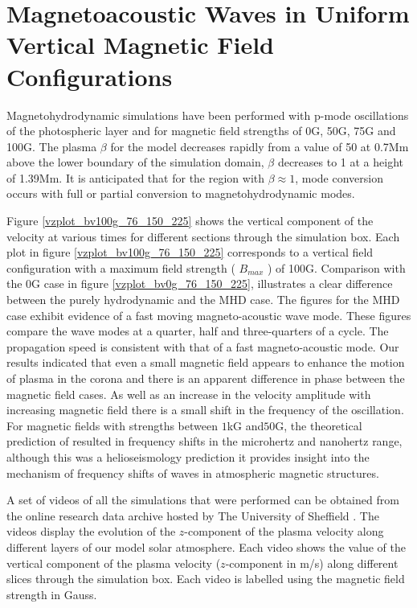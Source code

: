 \documentclass[linenumbers]{aastex63}
\begin{document}

\section{Magnetoacoustic Waves in Uniform Vertical Magnetic Field Configurations}
Magnetohydrodynamic simulations have been performed with p-mode oscillations of the photospheric layer and for magnetic field strengths of 0G, 50G, 75G and 100G. The plasma $\beta$ for the model decreases rapidly from a value of 50 at 0.7Mm above the lower boundary of the simulation domain, $\beta$ decreases to 1 at a height of 1.39Mm.  It is anticipated that for the region with $\beta \approx 1$, mode conversion occurs with full or partial conversion to magnetohydrodynamic modes. 

 Figure \ref{vzplot_bv100g_76_150_225} shows the vertical component of the velocity at various times for different sections through the simulation box. Each plot in  figure \ref{vzplot_bv100g_76_150_225} corresponds to a vertical field configuration with a maximum field strength ( $ B_{max} $ ) of 100G. Comparison with the 0G case in figure \ref{vzplot_bv0g_76_150_225}, illustrates a clear difference between the purely hydrodynamic and the MHD case. The figures for the MHD case exhibit evidence of a fast moving magneto-acoustic wave mode. These figures compare the wave modes at a quarter, half and three-quarters of a cycle. The propagation speed is consistent with that of a fast magneto-acoustic mode. Our results indicated that even a small magnetic field appears to enhance the motion of plasma in the corona and  there is an apparent difference in phase between the magnetic field cases. As well as an increase in the velocity amplitude with increasing magnetic field there is a small shift in the frequency of the oscillation. For magnetic fields with strengths between $1$kG and$50$G, the theoretical prediction of \citet{Hindman1996} resulted in frequency shifts in the microhertz and nanohertz range,  although this was a helioseismology prediction it provides insight into the mechanism of frequency shifts of waves in atmospheric magnetic structures. 

A set of videos of all the simulations that were performed can be obtained from the online research data archive hosted by The University of Sheffield \citet{Griffiths2018a}. The videos display the evolution of the $z$-component of the plasma velocity along different layers of our model solar atmosphere. Each video shows the value of the vertical component of the plasma velocity ($z$-component in m/s) along different slices through the simulation box. Each video is labelled using the magnetic field strength in Gauss.
\end{document}
